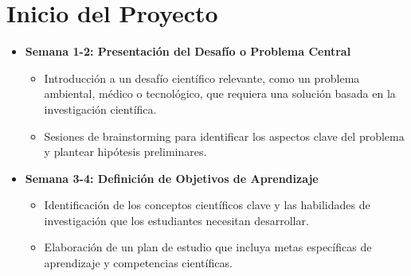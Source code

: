 \section{Inicio del Proyecto}
\begin{itemize}
  \item \textbf{Semana 1-2: Presentación del Desafío o Problema Central}
  \begin{itemize}
    \item Introducción a un desafío científico relevante, como un problema ambiental, médico o tecnológico, que requiera una solución basada en la investigación científica.
    \item Sesiones de brainstorming para identificar los aspectos clave del problema y plantear hipótesis preliminares.
  \end{itemize}
  \item \textbf{Semana 3-4: Definición de Objetivos de Aprendizaje}
  \begin{itemize}
    \item Identificación de los conceptos científicos clave y las habilidades de investigación que los estudiantes necesitan desarrollar.
    \item Elaboración de un plan de estudio que incluya metas específicas de aprendizaje y competencias científicas.
  \end{itemize}
\end{itemize}

